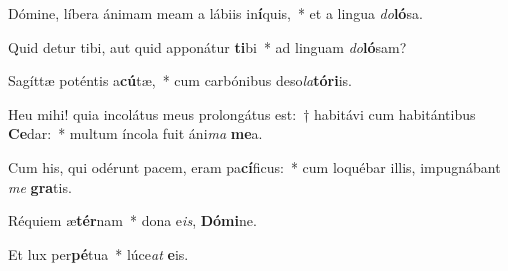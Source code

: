 \item Dómine, líbera ánimam meam a lábiis in\textbf{í}quis,~* et a lingua \textit{do}\textbf{ló}sa.

\item Quid detur tibi, aut quid apponátur \textbf{ti}bi~* ad linguam \textit{do}\textbf{ló}sam?

\item Sagíttæ poténtis a\textbf{cú}tæ,~* cum carbónibus deso\textit{la}\textbf{tó}\textbf{ri}is.

\item Heu mihi! quia incolátus meus prolongátus est:~† habitávi cum habitántibus \textbf{Ce}dar:~* multum íncola fuit áni\textit{ma} \textbf{me}a.

\item Cum his, qui odérunt pacem, eram pa\textbf{cí}ficus:~* cum loquébar illis, impugnábant \textit{me} \textbf{gra}tis.

\item Réquiem æ\textbf{tér}nam~* dona e\textit{is}, \textbf{Dó}\textbf{mi}ne.

\item Et lux per\textbf{pé}tua~* lúce\textit{at} \textbf{e}is.